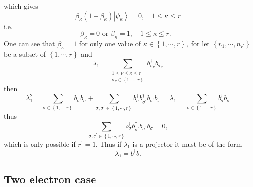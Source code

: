 \documentclass[aps,preprint,amsfonts,amssymb,showpacs,showkeys]{revtex4}%
\begin{document}
which gives
\begin{equation}
\beta_{\kappa}\left(  1-\beta_{\kappa}\right)  \left\vert \psi_{\kappa
}\right\rangle =0,\quad1\leq\kappa\leq r
\end{equation}
i.e.
\begin{equation}
\beta_{\kappa}=0\text{ or }\beta_{\kappa}=1,\quad1\leq\kappa\leq r.\text{ }%
\end{equation}
One can see that $\beta_{\kappa}=1$ for only one value of $\kappa\in\left\{
1,\cdots,r\right\}  ,$ for let $\left\{  n_{1},\cdots,n_{r^{\prime}}\right\}
$ be a subset of $\left\{  1,\cdots,r\right\}  $ and
\begin{equation}
\lambda_{1}=\sum_{\substack{1\leq\nu\leq\kappa\leq r\\\sigma_{\nu}\in\left\{
1,\cdots,r\right\}  }}b_{\sigma_{\nu}}^{\dagger}b_{\sigma_{\nu}}%
\end{equation}
then
\begin{equation}
\lambda_{1}^{2}=\sum_{\sigma\in\left\{  1,\cdots,r\right\}  }b_{\sigma
}^{\dagger}b_{\sigma}+\sum_{\sigma,\sigma^{\prime}\in\left\{  1,\cdots
,r\right\}  }b_{\sigma}^{\dagger}b_{\sigma^{\prime}}^{\dagger}b_{\sigma
^{\prime}}b_{\sigma}=\lambda_{1}=\sum_{\sigma\in\left\{  1,\cdots,r\right\}
}b_{\sigma}^{\dagger}b_{\sigma}%
\end{equation}
thus
\begin{equation}
\sum_{\sigma,\sigma^{\prime}\in\left\{  1,\cdots,r\right\}  }b_{\sigma
}^{\dagger}b_{\sigma^{\prime}}^{\dagger}b_{\sigma^{\prime}}b_{\sigma}=0,
\end{equation}
which is only possible if $r^{\prime}=1.$ Thus if $\lambda_{1}$ is a projector
it must be of the form
\begin{equation}
\lambda_{1}=b^{\dagger}b.
\end{equation}


\subsection{Two electron case}
\end{document}
